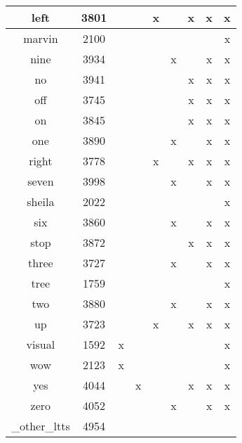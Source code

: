 \begin{table}[h!]
\begin{tabular}{|c|c|ccccccc|}
        left & 3801           &   &   & x &   & x & x & x  \\
        \hline
        marvin & 2100         &   &   &   &   &   &   & x  \\
        nine & 3934           &   &   &   & x &   & x & x  \\
        no & 3941             &   &   &   &   & x & x & x  \\
        off & 3745            &   &   &   &   & x & x & x  \\
        \hline
        on & 3845             &   &   &   &   & x & x & x  \\
        one & 3890            &   &   &   & x &   & x & x  \\
        right & 3778          &   &   & x &   & x & x & x  \\
        seven & 3998          &   &   &   & x &   & x & x  \\
        \hline
        sheila & 2022         &   &   &   &   &   &   & x  \\
        six & 3860            &   &   &   & x &   & x & x  \\
        stop & 3872           &   &   &   &   & x & x & x  \\
        three & 3727          &   &   &   & x &   & x & x  \\
        \hline
        tree & 1759           &   &   &   &   &   &   & x  \\
        two & 3880            &   &   &   & x &   & x & x  \\
        up & 3723             &   &   & x &   & x & x & x  \\
        visual & 1592         & x &   &   &   &   &   & x  \\
        \hline
        wow & 2123            & x &   &   &   &   &   & x  \\
        yes & 4044            &   & x &   &   & x & x & x  \\
        zero & 4052           &   &   &   & x &   & x & x  \\
        \_other\_ltts & 4954  &   &   &   &   &   &   &    \\
        \hline
    \end{tabular}
\end{table}

